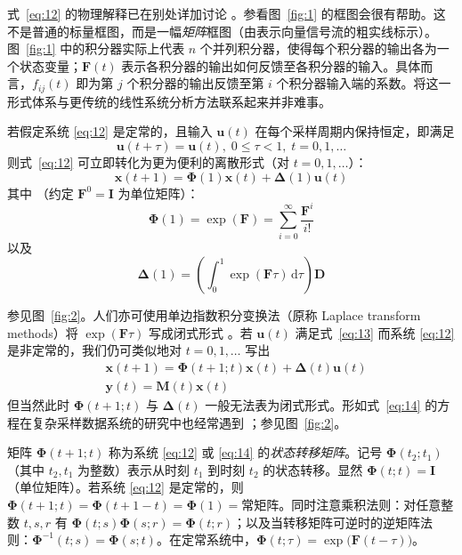 式~\eqref{eq:12} 的物理解释已在别处详加讨论 \cite{r18,r20,r23}。参看图~\ref{fig:1} 的框图会很有帮助。这不是普通的标量框图，而是一幅\emph{矩阵}框图（由表示向量信号流的粗实线标示）。图~\ref{fig:1} 中的积分器实际上代表 $n$ 个并列积分器，使得每个积分器的输出各为一个状态变量；$\bm{F}(t)$ 表示各积分器的输出如何反馈至各积分器的输入。具体而言，$f_{ij}(t)$ 即为第 $j$ 个积分器的输出反馈至第 $i$ 个积分器输入端的系数。将这一形式体系与更传统的线性系统分析方法联系起来并非难事。


若假定系统 \eqref{eq:12} 是定常的，且输入 $\bm{u}(t)$ 在每个采样周期内保持恒定，即满足
\begin{equation}\label{eq:13}
\bm{u}(t + \tau) = \bm{u}(t),\; 0 \leq \tau < 1,\; t = 0, 1, \dots
\end{equation}
则式~\eqref{eq:12} 可立即转化为更为便利的离散形式（对 $t = 0, 1, \dots$）：
\begin{equation*}
\bm{x}(t + 1) = \bm{\Phi}(1)\bm{x}(t) + \bm{\Delta}(1)\bm{u}(t)
\end{equation*}
其中 \cite{r18,r20}（约定 $\bm{F}^0 = \bm{I}$ 为单位矩阵）：
\begin{equation*}
\bm{\Phi}(1) = \exp(\bm{F}) = \sum_{i=0}^{\infty} \frac{\bm{F}^i}{i!}
\end{equation*}
以及
\begin{equation*}
\bm{\Delta}(1) = \left(\int_0^1 \exp(\bm{F}\tau)\,\mathrm{d}\tau\right) \bm{D}
\end{equation*}


参见图~\ref{fig:2}。人们亦可使用单边指数积分变换法（原称 Laplace transform methods）将 $\exp(\bm{F}\tau)$ 写成闭式形式 \cite{r18,r20,r22,r24}。若 $\bm{u}(t)$ 满足式~\eqref{eq:13} 而系统 \eqref{eq:12} 是非定常的，我们仍可类似地对 $t = 0, 1, \dots$ 写出
\begin{equation}\label{eq:14}
\begin{aligned}
&\bm{x}(t + 1) = \bm{\Phi}(t + 1; t)\bm{x}(t) + \bm{\Delta}(t)\bm{u}(t) \\
&\bm{y}(t) = \bm{M}(t)\bm{x}(t)
\end{aligned}
\end{equation}
但当然此时 $\bm{\Phi}(t + 1; t)$ 与 $\bm{\Delta}(t)$ 一般无法表为闭式形式。形如式~\eqref{eq:14} 的方程在复杂采样数据系统的研究中也经常遇到 \cite{r22}；参见图~\ref{fig:2}。

矩阵 $\bm{\Phi}(t + 1; t)$ 称为系统 \eqref{eq:12} 或 \eqref{eq:14} 的\emph{状态转移矩阵}。记号 $\bm{\Phi}(t_2; t_1)$（其中 $t_2, t_1$ 为整数）表示从时刻 $t_1$ 到时刻 $t_2$ 的状态转移。显然 $\bm{\Phi}(t; t) = \bm{I}$（单位矩阵）。若系统 \eqref{eq:12} 是定常的，则 $\bm{\Phi}(t + 1; t) = \bm{\Phi}(t + 1 - t) = \bm{\Phi}(1) = \text{常矩阵}$。同时注意乘积法则：对任意整数 $t, s, r$ 有 $\bm{\Phi}(t; s)\bm{\Phi}(s; r) = \bm{\Phi}(t; r)$；以及当转移矩阵可逆时的逆矩阵法则：$\bm{\Phi}^{-1}(t; s) = \bm{\Phi}(s; t)$。在定常系统中，$\bm{\Phi}(t; \tau) = \exp\bigl(\bm{F}(t - \tau)\bigr)$。

